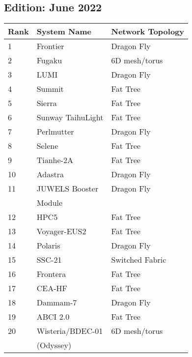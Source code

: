 \documentclass{article}
\begin{document}
\begin{minipage}{0.45\textwidth}
\subsection{Edition: June 2022}
\label{sec:edition:-june-2022}
\begin{tabular}[H]{||l|l|l||} \hline\hline
  Rank & System Name       & Network Topology \\ \hline\hline
  1    & Frontier          & Dragon Fly       \\ \hline
  2    & Fugaku            & 6D mesh/torus    \\ \hline
  3    & LUMI              & Dragon Fly       \\ \hline
  4    & Summit            & Fat Tree         \\ \hline
  5    & Sierra            & Fat Tree         \\ \hline
  6    & Sunway TaihuLight & Fat Tree         \\ \hline
  7    & Perlmutter        & Dragon Fly       \\ \hline
  8    & Selene            & Fat Tree         \\ \hline
  9    & Tianhe-2A         & Fat Tree         \\ \hline
  10   & Adastra           & Dragon Fly       \\ \hline
  11   & JUWELS Booster    & Dragon Fly       \\
       & Module            &                  \\ \hline
  12   & HPC5              & Fat Tree         \\ \hline
  13   & Voyager-EUS2      & Fat Tree         \\ \hline
  14   & Polaris           & Dragon Fly       \\ \hline
  15   & SSC-21            & Switched Fabric  \\ \hline
  16   & Frontera          & Fat Tree         \\ \hline
  17   & CEA-HF            & Fat Tree         \\ \hline
  18   & Dammam-7          & Dragon Fly       \\ \hline
  19   & ABCI 2.0          & Fat Tree         \\ \hline
  20   & Wisteria/BDEC-01  & 6D mesh/torus    \\ 
       & (Odyssey)         &                  \\ \hline\hline
\end{tabular}
\end{minipage}
\end{document}
